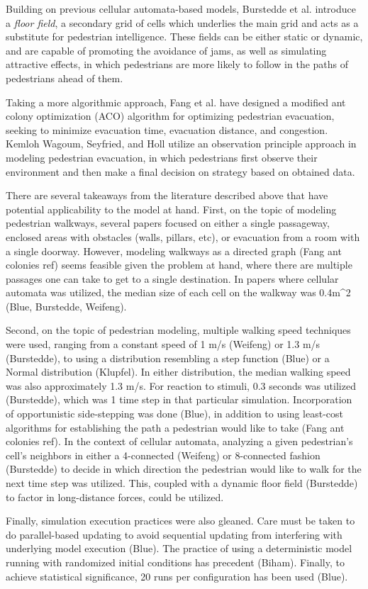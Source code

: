 \documentclass[12pt]{article}
\begin{document}
Building on previous cellular automata-based models, Burstedde et al.
\cite{burstedde2001simulation} introduce a \textit{floor field}, a secondary
grid of cells which underlies the main grid and acts as a substitute for
pedestrian intelligence. These fields can be either static or dynamic, and are
capable of promoting the avoidance of jams, as well as simulating attractive
effects, in which pedestrians are more likely to follow in the paths of
pedestrians ahead of them.

Taking a more algorithmic approach, Fang et al. \cite{fang2011hierarchical} have
designed a modified ant colony optimization (ACO) algorithm for optimizing
pedestrian evacuation, seeking to minimize evacuation time, evacuation distance,
and congestion. Kemloh Wagoum, Seyfried, and Holl \cite{kemloh2012modeling}
utilize an observation principle approach in modeling pedestrian evacuation,
in which pedestrians first observe their environment and then make a final
decision on strategy based on obtained data.

There are several takeaways from the literature described above that have potential applicability to the model at hand.  First, on the topic of modeling pedestrian walkways, several papers focused on either a single passageway, enclosed areas with obstacles (walls, pillars, etc), or evacuation from a room with a single doorway.  However, modeling walkways as a directed graph (Fang ant colonies ref) seems feasible given the problem at hand, where there are multiple passages one can take to get to a single destination.  In papers where cellular automata was utilized, the median size of each cell on the walkway was 0.4m^2 (Blue, Burstedde, Weifeng).

Second, on the topic of pedestrian modeling, multiple walking speed techniques were used, ranging from a constant speed of 1 m/s (Weifeng) or 1.3 m/s (Burstedde), to using a distribution resembling a step function (Blue) or a Normal distribution (Klupfel).  In either distribution, the median walking speed was also approximately 1.3 m/s.  For reaction to stimuli, 0.3 seconds was utilized (Burstedde), which was 1 time step in that particular simulation.  Incorporation of opportunistic side-stepping was done (Blue), in addition to using least-cost algorithms for establishing the path a pedestrian would like to take (Fang ant colonies ref).  In the context of cellular automata, analyzing a given pedestrian's cell's neighbors in either a 4-connected (Weifeng) or 8-connected fashion (Burstedde) to decide in which direction the pedestrian would like to walk for the next time step was utilized.  This, coupled with a dynamic floor field (Burstedde) to factor in long-distance forces, could be utilized.

Finally, simulation execution practices were also gleaned.  Care must be taken to do parallel-based updating to avoid sequential updating from interfering with underlying model execution (Blue).  The practice of using a deterministic model running with randomized initial conditions has precedent (Biham).  Finally, to achieve statistical significance, 20 runs per configuration has been used (Blue).

{}

\end{document}
